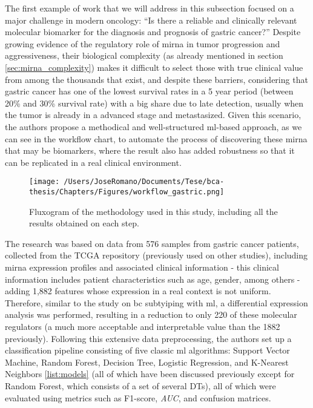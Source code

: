 The first example of work that we will address in this subsection focused on a
major challenge in modern oncology: “Is there a reliable and clinically
relevant molecular biomarker for the diagnosis and prognosis of gastric
cancer?” Despite growing evidence of the regulatory role of \gls{mirna} in
tumor progression and aggressiveness, their biological complexity (as already
mentioned in section \ref{sec:mirna_complexity}) makes it difficult to select
those with true clinical value from among the thousands that exist, and despite
these barriers, considering that gastric cancer has one of the lowest survival
rates in a 5 year period (between 20\% and 30\% survival rate) with a big share
due to late detection, usually when the tumor is already in a advanced stage
and metastasized. Given this scenario, the authors
\textcite{ml_gastric_Azari2023} propose a methodical and well-structured
\gls{ml}-based approach, as we can see in the workflow chart, to automate the
process of discovering these \gls{mirna} that may be biomarkers, where the
result also has added robustness so that it can be replicated in a real
clinical environment.

\begin{figure}
  \centering
  \texttt{[image: /Users/JoseRomano/Documents/Tese/bca-thesis/Chapters/Figures/workflow\_gastric.png]}
  \caption{Fluxogram of the methodology used in this study, including all the results obtained on each step. \cite{ml_gastric_Azari2023}}
\end{figure}

The research was based on data from 576 samples from gastric cancer patients,
collected from the TCGA repository (previously used on other studies),
including \gls{mirna} expression profiles and associated clinical information -
this clinical information includes patient characteristics such as age, gender,
among others - adding 1,882 features whose expression in a real context is not
uniform. Therefore, similar to the study on \gls{bc} subtyiping with \gls{ml},
a differential expression analysis was performed, resulting in a reduction to
only 220 of these molecular regulators (a much more acceptable and
interpretable value than the 1882 previously). Following this extensive data
preprocessing, the authors set up a classification pipeline consisting of five
classic \gls{ml} algorithms: Support Vector Machine, Random Forest, Decision
Tree, Logistic Regression, and K-Nearest Neighbors \ref{list:models} (all of
which have been discussed previously except for Random Forest, which consists
of a set of several DTs), all of which were evaluated using metrics such as
F1-score, \textit{AUC}, and confusion matrices.

